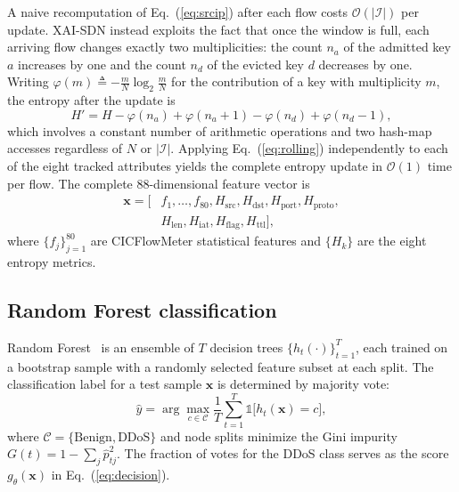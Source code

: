 ﻿\documentclass[journal]{IEEEtran}
\begin{document}
A naive recomputation of Eq.~(\ref{eq:srcip}) after each flow costs $\mathcal{O}(|\mathcal{I}|)$ per update. XAI-SDN instead exploits the fact that once the window is full, each arriving flow changes exactly two multiplicities: the count $n_a$ of the admitted key $a$ increases by one and the count $n_d$ of the evicted key $d$ decreases by one. Writing $\varphi(m) \triangleq -\frac{m}{N}\log_2\frac{m}{N}$ for the contribution of a key with multiplicity $m$, the entropy after the update is
\begin{equation}
H' = H - \varphi(n_a) + \varphi(n_a{+}1) - \varphi(n_d) + \varphi(n_d{-}1),
\label{eq:rolling}
\end{equation}
which involves a constant number of arithmetic operations and two hash-map accesses regardless of $N$ or $|\mathcal{I}|$. Applying Eq.~(\ref{eq:rolling}) independently to each of the eight tracked attributes yields the complete entropy update in $\mathcal{O}(1)$ time per flow. The complete 88-dimensional feature vector is
\begin{equation}
\begin{aligned}
\mathbf{x} = \bigl[ &f_1, \ldots, f_{80}, H_{\mathrm{src}}, H_{\mathrm{dst}}, H_{\mathrm{port}}, H_{\mathrm{proto}}, \\
&H_{\mathrm{len}}, H_{\mathrm{iat}}, H_{\mathrm{flag}}, H_{\mathrm{ttl}} \bigr],
\end{aligned}
\label{eq:fvec}
\end{equation}
where $\{f_j\}_{j=1}^{80}$ are CICFlowMeter statistical features and $\{H_k\}$ are the eight entropy metrics.

\subsection{Random Forest classification}
Random Forest~\cite{breiman2001rf} is an ensemble of $T$ decision trees $\{h_t(\cdot)\}_{t=1}^{T}$, each trained on a bootstrap sample with a randomly selected feature subset at each split. The classification label for a test sample $\mathbf{x}$ is determined by majority vote:
\begin{equation}
\hat{y} = \arg\max_{c \in \mathcal{C}} \frac{1}{T} \sum_{t=1}^{T} \mathbb{1}\bigl[h_t(\mathbf{x}) = c\bigr],
\label{eq:rfpred}
\end{equation}
where $\mathcal{C} = \{\text{Benign}, \text{DDoS}\}$ and node splits minimize the Gini impurity $G(t) = 1 - \sum_{j} \hat{p}_{tj}^{2}$. The fraction of votes for the DDoS class serves as the score $g_{\theta}(\mathbf{x})$ in Eq.~(\ref{eq:decision}).
\end{document}
